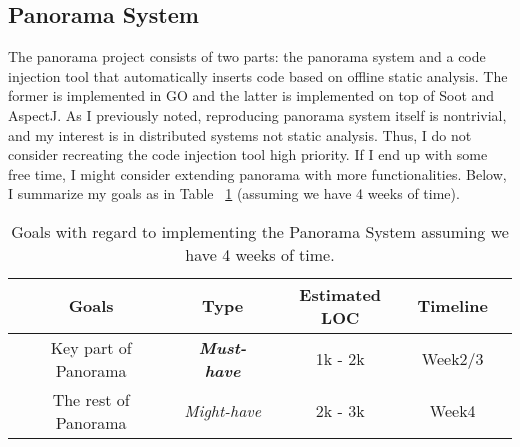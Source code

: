 \subsection{Panorama System}
The panorama project consists of two parts: the panorama system and a code injection tool that automatically inserts code based on offline static analysis. The former is implemented in GO and the latter is implemented on top of Soot and AspectJ. As I previously noted, reproducing panorama system itself is nontrivial, and my interest is in distributed systems not static analysis. Thus, I do not consider recreating the code injection tool high priority. If I end up with some free time, I might consider extending panorama with more functionalities. Below, I summarize my goals as in Table ~\ref{table:1} (assuming we have 4 weeks of time).
\begin{table}[h!]
  \centering
  \begin{tabular}{ |c|c|c|c|c| } 
  \hline
  Goals & Type & Estimated LOC & Timeline \\
  \hline
  Key part of Panorama & \textit{\textbf{Must-have}} & 1k - 2k & Week2/3\\ 
  The rest of Panorama & \textit{Might-have} & 2k - 3k & Week4\\ 
  \hline
  \end{tabular}
  \caption{Goals with regard to implementing the Panorama System assuming we have 4 weeks of time.}
  \label{table:1}
\end{table}
